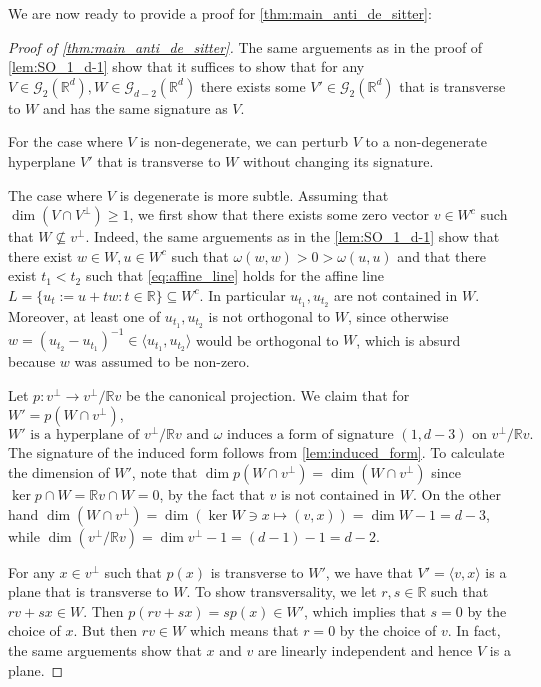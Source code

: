 \documentclass{report}
\begin{document}
We are now ready to provide a proof for \cref{thm:main_anti_de_sitter}:
\begin{proof}[Proof of \cref{thm:main_anti_de_sitter}]
    The same arguements as in the proof of \cref{lem:SO_1_d-1} show that it suffices to show that for any $V \in \mathcal G_2(\mathbb R^d), W \in \mathcal G_{d-2}(\mathbb R^d)$ there exists some $V' \in \mathcal G_2(\mathbb R^d)$ that is transverse to $W$ and has the same signature as $V$.
    
    For the case where $V$ is non-degenerate, we can perturb $V$ to a non-degenerate hyperplane $V'$ that is transverse to $W$ without changing its signature.
    
    The case where $V$ is degenerate is more subtle.
    Assuming that $\dim(V \cap V^\perp) \geq 1$, we first show that there exists some zero vector $v \in W^c$ such that $W \not \subseteq v^\perp$.
    Indeed, the same arguements as in the \cref{lem:SO_1_d-1} show that there exist $w \in W, u \in W^c$ such that $\omega(w,w) > 0 > \omega(u,u)$ and that there exist $t_1 < t_2$ such that 
    \cref{eq:affine_line} holds for the affine line $L = \{ u_t := u + tw : t \in \mathbb R \} \subseteq W^c$.
    In particular $u_{t_1}, u_{t_2}$ are not contained in $W$.
    Moreover, at least one of $u_{t_1}, u_{t_2}$ is not orthogonal to $W$, since otherwise $w = (u_{t_2} - u_{t_1})^{-1} \in \langle u_{t_1}, u_{t_2} \rangle$ would be orthogonal to $W$, which is absurd because $w$ was assumed to be non-zero. 
    
    Let $p: v^\perp \to v^\perp/\mathbb Rv$ be the canonical projection.
    We claim that for $W' = p(W \cap v^\perp)$,
    \[
    W' \text{ is a hyperplane of } v^\perp/\mathbb Rv \text{ and } \omega \text{ induces a form of signature } (1, d-3) \text{ on } v^\perp/\mathbb Rv.
    \]
    The signature of the induced form follows from \cref{lem:induced_form}.
    To calculate the dimension of $W'$, note that $\dim p(W \cap v^\perp) = \dim(W \cap v^\perp)$ since $\ker p \cap W = \mathbb R v \cap W = 0$, by the fact that $v$ is not contained in $W$.
    On the other hand $\dim (W \cap v^\perp) = \dim(\ker W \ni x \mapsto (v,x)) = \dim W - 1 = d-3$, while $\dim (v^\perp/\mathbb R v) = \dim v^\perp - 1 = (d-1)- 1 = d-2$.

    For any $x \in v^\perp$ such that $p(x)$ is transverse to $W'$, we have that $V' = \langle v, x \rangle$ is a plane that is transverse to $W$.
    To show transversality, we let $r, s \in \mathbb R$ such that $r v + s x \in W$.
    Then $p(r v + s x) = s p(x) \in W'$, which implies that $s = 0$ by the choice of $x$.
    But then $r v \in W$ which means that $r = 0$ by the choice of $v$.
    In fact, the same arguements show that $x$ and $v$ are linearly independent and hence $V$ is a plane.


\end{proof}
\end{document}
